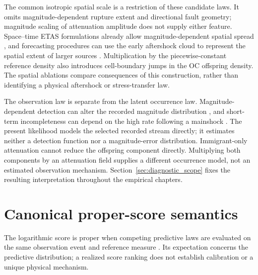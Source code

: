The common isotropic spatial scale is a restriction of these candidate laws. It omits magnitude-dependent rupture extent and directional fault geometry; magnitude scaling of attenuation amplitude does not supply either feature. Space--time ETAS formulations already allow magnitude-dependent spatial spread \citep{Ogata1998}, and forecasting procedures can use the early aftershock cloud to represent the spatial extent of larger sources \citep{HelmstetterKaganJackson2006,WernerEtAl2011}. Multiplication by the piecewise-constant reference density also introduces cell-boundary jumps in the OC offspring density. The spatial ablations compare consequences of this construction, rather than identifying a physical aftershock or stress-transfer law.

The observation law is separate from the latent occurrence law.
Magnitude-dependent detection can alter the recorded magnitude distribution
\citep{Mignan2012}, and short-term incompleteness can depend on the high rate
following a mainshock \citep{Hainzl2016Incompleteness}. The present likelihood
models the selected recorded stream directly; it estimates neither a detection
function nor a magnitude-error distribution. Immigrant-only attenuation cannot
reduce the offspring component directly. Multiplying both components by an
attenuation field supplies a different occurrence model, not an estimated
observation mechanism. Section~\ref{sec:diagnostic_scope} fixes the resulting
interpretation throughout the empirical chapters.

\section{Canonical proper-score semantics}\label{sec:master-scores}

The logarithmic score is proper when competing predictive laws are evaluated
on the same observation event and reference measure
\citep{GneitingRaftery2007}. Its expectation concerns the predictive
distribution; a realized score ranking does not establish calibration or a
unique physical mechanism.


